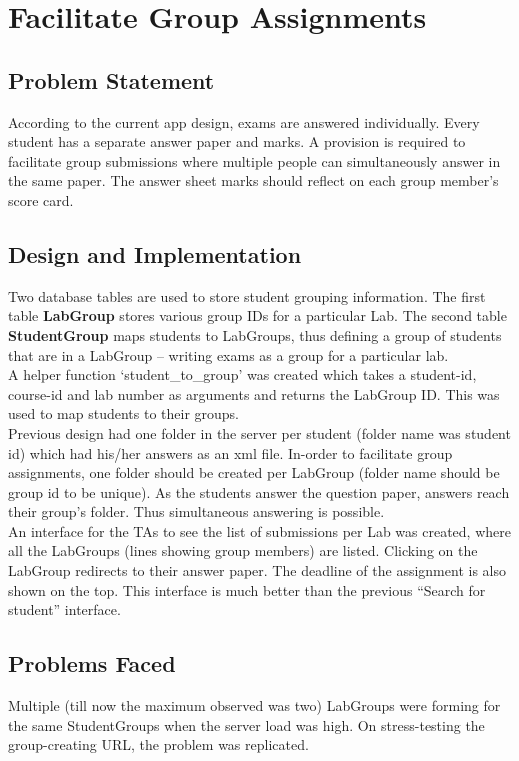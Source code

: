 \section{Facilitate Group Assignments}

\subsection{Problem Statement}
According to the current app design, exams are answered individually. Every student has a separate answer paper and marks. A provision is required to facilitate group submissions where multiple people can simultaneously answer in the same paper. The answer sheet marks should reflect on each group member's score card.

\subsection{Design and Implementation}
Two database tables are used to store student grouping information. The first table \textbf{LabGroup} stores various group IDs for a particular Lab. The second table \textbf{StudentGroup} maps students to LabGroups, thus defining a group of students that are in a LabGroup -- writing exams as a group for a particular lab.\\

A helper function `student\_to\_group' was created which takes a student-id, course-id and lab number as arguments and returns the LabGroup ID. This was used to map students to their groups.\\

Previous design had one folder in the server per student (folder name was student id) which had his/her answers as an xml file. In-order to facilitate group assignments, one folder should be created per LabGroup (folder name should be group id to be unique). As the students answer the question paper, answers reach their group's folder. Thus simultaneous answering is possible.\\

An interface for the TAs to see the list of submissions per Lab was created, where all the LabGroups (lines showing group members) are listed. Clicking on the LabGroup redirects to their answer paper. The deadline of the assignment is also shown on the top. This interface is much better than the previous ``Search for student'' interface.

\subsection{Problems Faced}
Multiple (till now the maximum observed was two) LabGroups were forming for the same StudentGroups when the server load was high. On stress-testing the group-creating URL, the problem was replicated.\\

